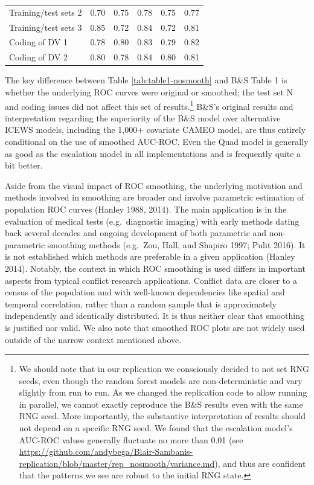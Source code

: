 \documentclass[
]{article}
\begin{document}
\begin{table}
\begin{tabular}[t]{lrrrrr}
\hspace{1em}Training/test sets 2 & 0.70 & 0.75 & 0.78 & 0.75 & 0.77\\
\hspace{1em}Training/test sets 3 & 0.85 & 0.72 & 0.84 & 0.72 & 0.81\\
\hspace{1em}Coding of DV 1 & 0.78 & 0.80 & 0.83 & 0.79 & 0.82\\
\hspace{1em}Coding of DV 2 & 0.80 & 0.78 & 0.84 & 0.80 & 0.81\\
\bottomrule
\end{tabular}
\end{table}

The key difference between Table \ref{tab:table1-nosmooth} and B\&S Table 1 is whether the underlying ROC curves were original or smoothed; the test set N and coding issues did not affect this set of results.\footnote{We should note that in our replication we consciously decided to not set RNG seeds, even though the random forest models are non-deterministic and vary slightly from run to run. As we changed the replication code to allow running in parallel, we cannot exactly reproduce the B\&S results even with the same RNG seed. More importantly, the substantive interpretation of results should not depend on a specific RNG seed. We found that the escalation model's AUC-ROC values generally fluctuate no more than 0.01 (see \url{https://github.com/andybega/Blair-Sambanis-replication/blob/master/rep_nosmooth/variance.md}), and thus are confident that the patterns we see are robust to the initial RNG state.} B\&S's original results and interpretation regarding the superiority of the B\&S model over alternative ICEWS models, including the 1,000+ covariate CAMEO model, are thus entirely conditional on the use of smoothed AUC-ROC. Even the Quad model is generally as good as the escalation model in all implementations and is frequently quite a bit better.

Aside from the visual impact of ROC smoothing, the underlying motivation and methods involved in smoothing are broader and involve parametric estimation of population ROC curves (Hanley 1988, 2014). The main application is in the evaluation of medical tests (e.g.~diagnostic imaging) with early methods dating back several decades and ongoing development of both parametric and non-parametric smoothing methods (e.g.~Zou, Hall, and Shapiro 1997; Pulit 2016). It is not established which methods are preferable in a given application (Hanley 2014). Notably, the context in which ROC smoothing is used differs in important aspects from typical conflict research applications. Conflict data are closer to a census of the population and with well-known dependencies like spatial and temporal correlation, rather than a random sample that is approximately independently and identically distributed. It is thus neither clear that smoothing is justified nor valid. We also note that smoothed ROC plots are not widely used outside of the narrow context mentioned above.
\end{document}
